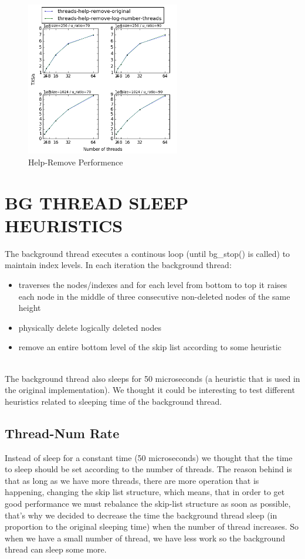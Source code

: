 \documentclass{article}
\begin{document}
\begin{figure}
	\caption{Help-Remove Performence}
	\centering
	\includegraphics[width=0.6\textwidth]{help-remove_plot}
\end{figure}

\section{BG THREAD SLEEP HEURISTICS}
\label{sec:bts}

The background thread executes a continous loop (until bg\_stop() is called) to maintain index levels. In each iteration the background thread:
\begin{itemize}
	\item traverses the nodes/indexes and for each level from bottom to top it raises each node in the middle of three consecutive non-deleted nodes of the same height 
	\item physically delete logically deleted nodes
	\item remove an entire bottom level of the skip list according to some heuristic
\end{itemize}
\\
The background thread also sleeps for 50 microseconds (a heuristic that is used in the original implementation). We thought it could be interesting to test different heuristics related to sleeping time of the background thread.


\subsection{Thread-Num Rate}
\label{ssec:dsrs1}

Instead of sleep for a constant time (50 microseconds) we thought that the time to sleep should be set according to the number of threads. The reason behind is that as long as we have more threads, there are more operation that is happening, changing the skip list structure, which means, that in order to get good performance we must rebalance the skip-list structure as soon as possible, that's why we decided to decrease the time the background thread sleep (in proportion to the original sleeping time) when the number of thread increases. So when we have a small number of thread, we have less work so the background thread can sleep some more.
\end{document}
